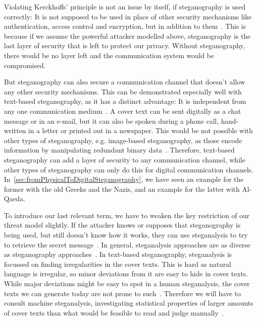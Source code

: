 Violating Kerckhoffs' principle is not an issue by itself, if steganography is used correctly: It is not supposed to be used in place of other security mechanisms like authentication, access control and encryption, but in addition to them~\cite{al-aniOverviewMainFundamentals2010}. This is because if we assume the powerful attacker modelled above, steganography is the last layer of security that is left to protect our privacy. Without steganography, there would be no layer left and the communication system would be compromised.

But steganography can also secure a communication channel that doesn't allow any other security mechanisms. This can be demonstrated especially well with text-based steganography, as it has a distinct advantage: It is independent from any one communication medium~\cite{zieglerNeuralLinguisticSteganography2019}. A cover text can be sent digitally as a chat message or in an e-mail, but it can also be spoken during a phone call, hand-written in a letter or printed out in a newspaper. This would be not possible with other types of steganography, e.g. image-based steganography, as those encode information by manipulating redundant binary data~\cite{bennettLinguisticSteganographySurvey2004}. Therefore, text-based steganography can add a layer of security to any communication channel, while other types of steganography can only do this for digital communication channels. In~\cref{sec:fromPhysicalToDigitalSteganography}, we have seen an example for the former with the old Greeks and the Nazis, and an example for the latter with Al-Qaeda.

To introduce our last relevant term, we have to weaken the key restriction of our threat model slightly. If the attacker knows or supposes that steganography is being used, but still doesn't know how it works, they can use steganalysis to try to retrieve the secret message~\cite{bennettLinguisticSteganographySurvey2004}. In general, steganalysis approaches are as diverse as steganography approaches~\cite{bennettLinguisticSteganographySurvey2004}. In text-based steganography, steganalysis is focussed on finding irregularities in the cover texts. This is hard as natural language is irregular, so minor deviations from it are easy to hide in cover texts. While major deviations might be easy to spot in a human steganalysis, the cover texts we can generate today are not prone to such~\cite{wuGenerativeTextSteganography2024}. Therefore we will have to consult machine steganalysis, investigating statistical properties of larger amounts of cover texts than what would be feasible to read and judge manually~\cite{yangSeSyLinguisticSteganalysis2022,wuGenerativeTextSteganography2024}.

